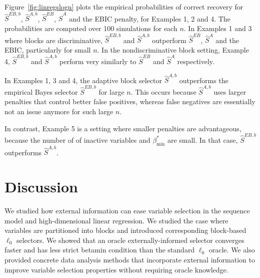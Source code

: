 \documentclass[aos]{imsart}
\theoremstyle{plain}
\begin{document}
Figure~\ref{fig:linregslogn} plots the empirical probabilities of correct recovery for $\hat S^{EB,b}$, $\hat S^{A,b}$, $\hat S^{EB}$, $\hat S^{A}$ and the EBIC penalty, for Examples 1, 2 and 4. The probabilities are computed over 100 simulations for each $n$.
In Examples 1 and 3 where blocks are discriminative,
$\hat S^{EB,b}$ and $\hat S^{A,b}$ outperform $\hat S^{EB}$, $\hat S^{A}$ and the EBIC, particularly for small $n$. %
In the nondiscriminative block setting, Example 4, $\hat S^{EB,b}$ and $\hat S^{A,b}$ perform very similarly to  $\hat S^{EB}$ and $\hat S^{A}$ respectively.

In Examples 1, 3 and 4, the adaptive block selector $\hat S^{A,b}$ outperforms the empirical Bayes selector $\hat S^{EB,b}$ for large $n$. This occurs because $\hat{S}^{A,b}$ uses larger penalties
that control better false positives, whereas false negatives are essentially not an issue anymore for such large $n$. 

In contrast, Example 5 is a setting where smaller penalties are advantageous, because the number of of inactive variables and $\beta_{\min}^*$ are small. In that case,  $\hat S^{EB,b}$ outperforms $\hat S^{A,b}$.

\section{Discussion}\label{sec:discussion}

We studied %
how external information can ease variable selection in the sequence model and high-dimensional linear regression. We studied the case where 
variables are partitioned %
into blocks %
and introduced corresponding block-based %
$\ell_0$ selectors. %
We showed that an oracle externally-informed selector converges faster and has less strict betamin condition than the standard $\ell_0$ oracle. We also provided concrete data analysis methods that incorporate external information to improve variable selection properties without requiring oracle knowledge.
\end{document}

